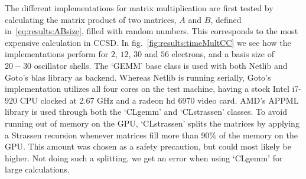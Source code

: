 The different implementations for matrix multiplication are first tested by calculating the matrix product of two matrices, $A$ and $B$, defined in~\eqref{eq:results:ABsize}, filled with random numbers.
This corresponds to the most expensive calculation in CCSD.
In fig.~\ref{fig:results:timeMultCC} we see how the implementations perform for $2$, $12$, $30$ and $56$ electrons, and a basis size of $20-30$ oscillator shells.
The `GEMM' base class is used with both Netlib and Goto's blas library as backend.
Whereas Netlib is running serially, Goto's implementation utilizes all four cores on the test machine, having a stock Intel i7-920 CPU clocked at 2.67 GHz and a radeon hd 6970 video card.
AMD's APPML library is used through both the `CLgemm' and `CLstrassen' classes.
To avoid running out of memory on the GPU, `CLstrassen' splits the matrices by applying a Strassen recursion whenever matrices fill more than 90\% of the memory on the GPU.
This amount was chosen as a safety precaution, but could most likely be higher.
Not doing such a splitting, we get an error when using `CLgemm' for large calculations.
